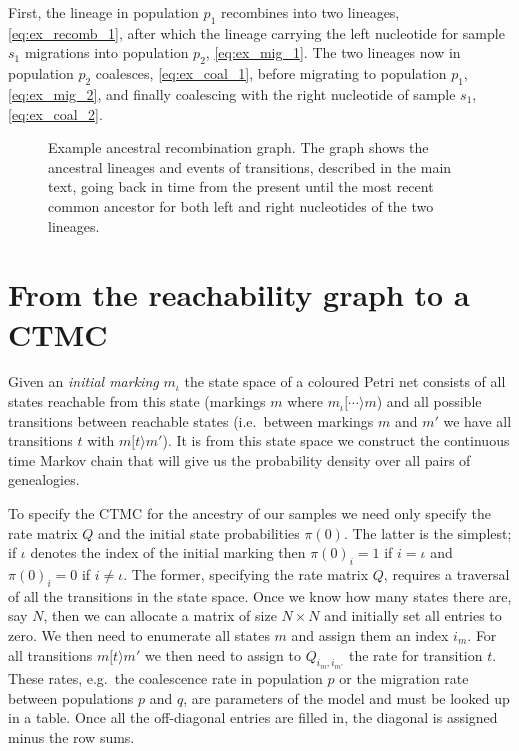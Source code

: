 First, the lineage in population $p_1$ recombines into two lineages, \eqref{eq:ex_recomb_1}, after which the lineage carrying the left nucleotide for sample $s_1$ migrations into population $p_2$, \eqref{eq:ex_mig_1}. The two lineages now in population $p_2$ coalesces, \eqref{eq:ex_coal_1}, before migrating to population $p_1$, \eqref{eq:ex_mig_2}, and finally coalescing with the right nucleotide of sample $s_1$, \eqref{eq:ex_coal_2}.

\begin{figure}[tb]
  \caption{Example ancestral recombination graph. The graph shows the ancestral lineages and events of transitions, described in the main text, going back in time from the present until the most recent common ancestor for both left and right nucleotides of the two lineages.}
  \label{fig:cpn-arg}
\end{figure}


\section{From the reachability graph to a CTMC}

Given an \emph{initial marking} $m_\iota$ the state space of a coloured Petri net consists of all states reachable from this state (markings $m$ where $m_\iota[\cdots\rangle m$) and all possible transitions between reachable states (i.e.\ between markings $m$ and $m'$ we have all transitions $t$ with $m[t\rangle m'$). It is from this state space we construct the continuous time Markov chain that will give us the probability density over all pairs of genealogies.

To specify the CTMC for the ancestry of our samples we need only specify the rate matrix $Q$ and the initial state probabilities $\pi(0)$. The latter is the simplest; if $\iota$ denotes the index of the initial marking then $\pi(0)_i = 1$ if $i=\iota$ and $\pi(0)_i = 0$ if $i\neq\iota$. The former, specifying the rate matrix $Q$, requires a traversal of all the transitions in the state space. Once we know how many states there are, say $N$, then we can allocate a matrix of size $N\times N$ and initially set all entries to zero. We then need to enumerate all states $m$ and assign them an index $i_m$. For all transitions $m[t\rangle m'$ we then need to assign to $Q_{i_m,i_{m'}}$ the rate for transition $t$. These rates, e.g.\ the coalescence rate in population $p$ or the migration rate between populations $p$ and $q$, are parameters of the model and must be looked up in a table. Once all the off-diagonal entries are filled in, the diagonal is assigned minus the row sums.


